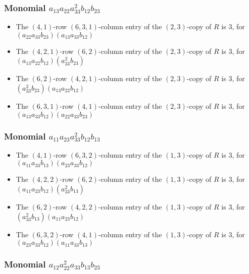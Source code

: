 \documentclass{article}
\begin{document}
\subsubsection{Monomial $ a_{13} a_{22} a_{33}^{2} b_{12} b_{23} $}

\begin{itemize}
\item The $(4, 1)$-row $(6, 3, 1)$-column entry of the $ \left(2, 3\right) $-copy of $R$ is $ 3 $, for $( a_{22} a_{33} b_{23} )( a_{13} a_{33} b_{12} )$ 
\item The $(4, 2, 1)$-row $(6, 2)$-column entry of the $ \left(2, 3\right) $-copy of $R$ is $ 3 $, for $( a_{13} a_{22} b_{12} )( a_{33}^{2} b_{23} )$ 
\item The $(6, 2)$-row $(4, 2, 1)$-column entry of the $ \left(2, 3\right) $-copy of $R$ is $ 3 $, for $( a_{33}^{2} b_{23} )( a_{13} a_{22} b_{12} )$ 
\item The $(6, 3, 1)$-row $(4, 1)$-column entry of the $ \left(2, 3\right) $-copy of $R$ is $ 3 $, for $( a_{13} a_{33} b_{12} )( a_{22} a_{33} b_{23} )$ 
\end{itemize}
\subsubsection{Monomial $ a_{11} a_{23} a_{33}^{2} b_{12} b_{13} $}

\begin{itemize}
\item The $(4, 1)$-row $(6, 3, 2)$-column entry of the $ \left(1, 3\right) $-copy of $R$ is $ 3 $, for $( a_{11} a_{33} b_{13} )( a_{23} a_{33} b_{12} )$ 
\item The $(4, 2, 2)$-row $(6, 2)$-column entry of the $ \left(1, 3\right) $-copy of $R$ is $ 3 $, for $( a_{11} a_{23} b_{12} )( a_{33}^{2} b_{13} )$ 
\item The $(6, 2)$-row $(4, 2, 2)$-column entry of the $ \left(1, 3\right) $-copy of $R$ is $ 3 $, for $( a_{33}^{2} b_{13} )( a_{11} a_{23} b_{12} )$ 
\item The $(6, 3, 2)$-row $(4, 1)$-column entry of the $ \left(1, 3\right) $-copy of $R$ is $ 3 $, for $( a_{23} a_{33} b_{12} )( a_{11} a_{33} b_{13} )$ 
\end{itemize}
\subsubsection{Monomial $ a_{12} a_{22}^{2} a_{33} b_{13} b_{23} $}
\end{document}

